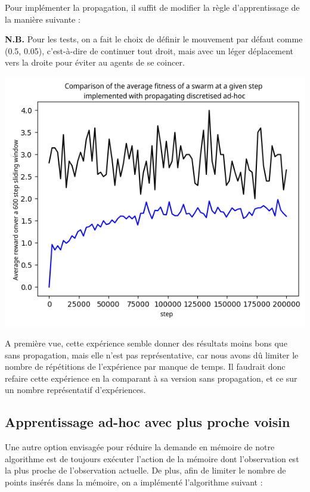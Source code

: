 \documentclass[a4paper, 12pt]{report}
\begin{document}
	Pour implémenter la propagation, il suffit de modifier la règle d'apprentissage de la manière suivante :
	
	
	
	\textbf{N.B.} Pour les tests, on a fait le choix de définir le mouvement par défaut comme (0.5, 0.05), c'est-à-dire de continuer tout droit, mais avec un léger déplacement vers la droite pour éviter au agents de se coincer.

\begin{center}
	\includegraphics{D2Propag}
\end{center}	
A première vue, cette expérience semble donner des résultats moins bons que sans propagation, mais elle n'est pas représentative, car nous avons dû limiter le nombre de répétitions de l'expérience par manque de temps. Il faudrait donc refaire cette expérience en la comparant à sa version sans propagation, et ce sur un nombre représentatif d'expériences.
	
	
	\subsection{Apprentissage ad-hoc avec plus proche voisin}
	Une autre option envisagée pour réduire la demande en mémoire de notre algorithme est de toujours exécuter l'action de la mémoire dont l'observation est la plus proche de l'observation actuelle.
	De plus, afin de limiter le nombre de points insérés dans la mémoire, on a implémenté l'algorithme suivant :
\end{document}
